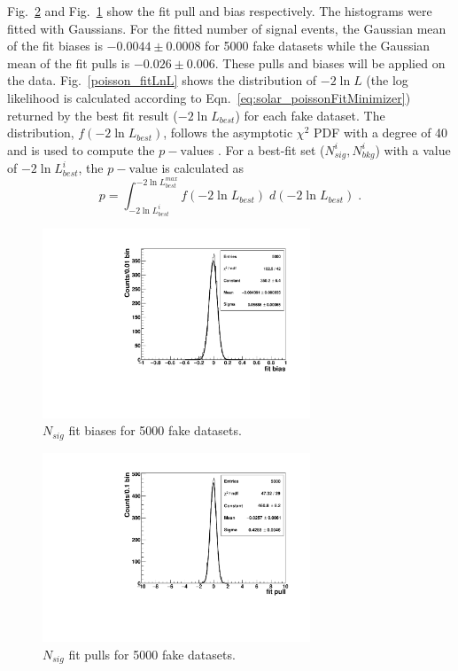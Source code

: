 Fig.~\ref{poisson_fitPull} and Fig.~\ref{poisson_fitBias} show the fit pull and bias respectively. The histograms were fitted with Gaussians. For the fitted number of signal events, the Gaussian mean of the fit biases is $-0.0044\pm0.0008$ for 5000 fake datasets while the Gaussian mean of the fit pulls is $-0.026\pm0.006$. These pulls and biases will be applied on the data. Fig.~\ref{poisson_fitLnL} shows the distribution of $-2\ln L$ (the log likelihood is calculated according to Eqn.~\ref{eq:solar_poissonFitMinimizer}) returned by the best fit result ($-2\ln L_{best}$) for each fake dataset. The distribution, $f({-2\ln L_{best}})$, follows the asymptotic $\chi^2$ PDF with a degree of 40 and is used to compute the $p-\mathrm{value}$s \cite{pdg2020}. For a best-fit set ($N^i_{sig},N^i_{bkg}$) with a value of $-2\ln L^i_{best}$, the $p-\mathrm{value}$ is calculated as
\begin{equation*}
p=\int_{-2\ln L^{i}_{best}}^{-2\ln L^{max}_{best}}f({-2\ln L_{best}}) \; d(-2\ln L_{best}) \; .
\end{equation*}


\begin{figure}[!htb]
	\centering
	\includegraphics[width=8cm]{ensemble_fitBias.pdf}
	\caption{$N_{sig}$ fit biases for 5000 fake datasets.}
	\label{poisson_fitBias}
\end{figure} 

\begin{figure}[!htb]
	\centering
	\includegraphics[width=8cm]{ensemble_fitPull.pdf}
	\caption{$N_{sig}$ fit pulls for 5000 fake datasets.}
	\label{poisson_fitPull}
\end{figure} 


